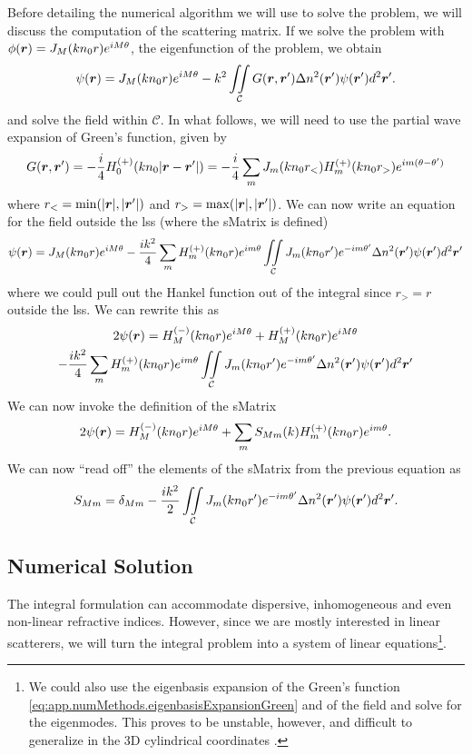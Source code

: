 Before detailing the numerical algorithm we will use to solve the problem, 
we will discuss the computation of the scattering matrix. 
If we solve the problem with $\phi(\boldsymbol{r}) = J_M(kn_0r)e^{iM\theta}$, 
the eigenfunction of the problem, we obtain
	\begin{equation}
		\psi(\boldsymbol{r}) = J_M(kn_0r)e^{iM\theta} -k^2\mathop{\iint}_\mathcal{C}G(\boldsymbol{r},\boldsymbol{r}')\Delta n^2(\boldsymbol{r}')\psi(\boldsymbol{r}')d^2\boldsymbol{r}'.
	\end{equation}
and solve the field within $\mathcal{C}$. In what follows, we will
need to use the partial wave expansion of Green's function, given by
\cite{ECO2006}
	\begin{equation}
		\label{eq:app.numMethods.eigenbasisExpansionGreen}
		G(\boldsymbol{r},\boldsymbol{r}') = -\frac{i}{4}H_0^{(+)}(kn_0|\boldsymbol{r}-\boldsymbol{r}'|) = -\frac{i}{4}\sum_m J_m(kn_0r_<)H_m^{(+)}(kn_0r_>)e^{im(\theta-\theta')}
	\end{equation}
where $r_<=\min(|\boldsymbol{r}|,|\boldsymbol{r}'|)$ and $r_>=\max(|\boldsymbol{r}|,|\boldsymbol{r}'|)$.
We can now write an equation for the field outside the \gls{lss} (where
the \gls{sMatrix} is defined)
	\begin{equation}
			\psi(\boldsymbol{r}) = J_M(kn_0r)e^{iM\theta}
						-\frac{ik^2}{4}\sum_m H_m^{(+)}(kn_0r)e^{im\theta}
						\mathop{\iint}_\mathcal{C} J_m(kn_0r')e^{-im\theta'}\Delta n^2(\boldsymbol{r}')\psi(\boldsymbol{r}')d^2\boldsymbol{r}'
	\end{equation}
where we could pull out the Hankel function out of the integral since
$r_>=r$ outside the \gls{lss}. We can rewrite this as
	\begin{multline}
		2\psi(\boldsymbol{r}) = H_M^{(-)}(kn_0r)e^{iM\theta}+H_M^{(+)}(kn_0r)e^{iM\theta} \\
						-\frac{ik^2}{4}\sum_m H_m^{(+)}(kn_0r)e^{im\theta}
						\mathop{\iint}_\mathcal{C} J_m(kn_0r')e^{-im\theta'}\Delta n^2(\boldsymbol{r}')\psi(\boldsymbol{r}')d^2\boldsymbol{r}'
	\end{multline}
We can now invoke the definition of the \gls{sMatrix}
	\begin{equation}
		2\psi(\boldsymbol{r}) = H_M^{(-)}(kn_0r)e^{iM\theta}+\sum_m S_{Mm}(k)H_m^{(+)}(kn_0r)e^{im\theta}.
	\end{equation}
We can now ``read off'' the elements of the \gls{sMatrix}
from the previous equation as
	\begin{equation}
		S_{Mm} = \delta_{Mm}-\frac{ik^2}{2}\mathop{\iint}_\mathcal{C}J_m(kn_0r')e^{-im\theta'}\Delta n^2(\boldsymbol{r}')\psi(\boldsymbol{r}')d^2\boldsymbol{r}'.
	\end{equation}

\subsection{Numerical Solution}
The integral formulation can accommodate dispersive, inhomogeneous and even non-linear refractive indices. 
However, since we are mostly interested in linear scatterers, we will turn the integral problem
into a system of linear equations\footnote{We could also use the eigenbasis expansion
of the Green's function \eqref{eq:app.numMethods.eigenbasisExpansionGreen} and of
the field and solve for the eigenmodes. This proves to be unstable, however, and
difficult to generalize in the 3D cylindrical coordinates \cite{BEN1968}.}.

